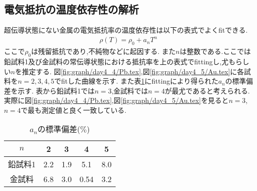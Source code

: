 \subsection{電気抵抗の温度依存性の解析}
超伝導状態にない金属の電気抵抗率の温度依存性は以下の表式でよくfitできる.
\begin{align}
  \rho(T)=\rho_0+a_nT^n
\end{align}
ここで$\rho_0$は残留抵抗であり,不純物などに起因する.
また$n$は整数である.ここでは鉛試料1及び金試料の常伝導状態における抵抗率を上の表式でfittingし,尤もらしい$n$を推定する.
図\ref{fig:graph/day4_4/Pb.tex},図\ref{fig:graph/day4_5/Au.tex}に各試料を$n=2,3,4,5$でfitした曲線を示す.
また表\ref{tab:an}にfittingにより得られた$a_n$の標準偏差を示す.
表から鉛試料1では$n=3$,金試料では$n=4$が最尤であると考えられる.
実際に図\ref{fig:graph/day4_4/Pb.tex},図\ref{fig:graph/day4_5/Au.tex}を見ると$n=3$, $n=4$で最も測定値と良く一致している.
\begin{table}[h]
\caption{$a_n$の標準偏差($\%$)}
\label{tab:an}
\centering
\begin{tabular}{c|cccc}
\hline
$n$&2&3&4&5\\
\hline \hline
鉛試料1&2.2&1.9&5.1&8.0\\
金試料&6.8&3.0&0.54&3.2\\
\hline
\end{tabular}
\end{table}
